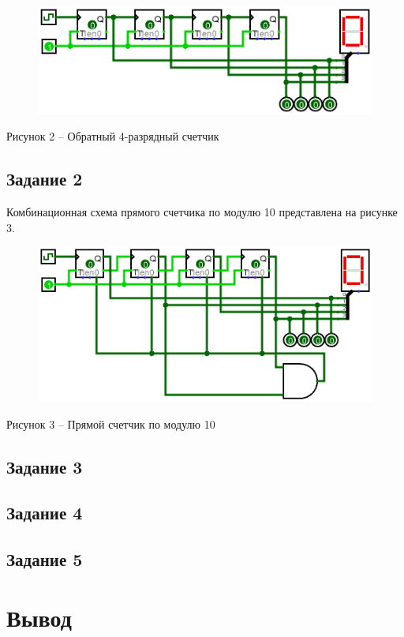 \documentclass[a4paper,14pt]{extarticle}
\begin{document}
	\begin{figure}[h]
		\centering
		\includegraphics[width=0.8\linewidth]{images/s-1-2}
	\end{figure}
	\begin{center}
		Рисунок 2 – Обратный 4-разрядный счетчик
	\end{center}
	
	\pagebreak
	\subsection*{Задание 2}
	Комбинационная схема прямого счетчика по модулю 10 представлена на рисунке 3.
	
	\begin{figure}[h]
		\centering
		\includegraphics[width=0.8\linewidth]{images/s-2}
	\end{figure}
	\begin{center}
		Рисунок 3 – Прямой счетчик по модулю 10
	\end{center}
	
	\subsection*{Задание 3}
	
	\subsection*{Задание 4}
	
	\subsection*{Задание 5}
	
	\section*{Вывод}
	
\end{document}
